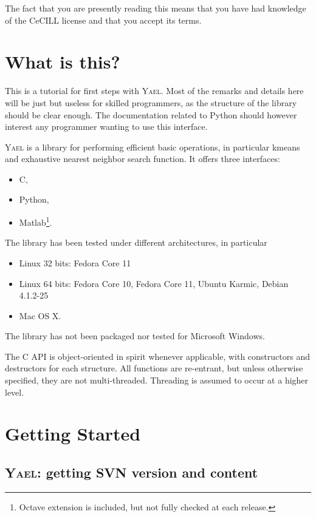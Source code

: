 \documentclass[a4paper,11pt,notitlepage,final,twoside]{report}
\newcommand{\yael}{\textsc{Yael}\xspace}
\begin{document}
The fact that you are presently reading this means that you have had
knowledge of the CeCILL license and that you accept its terms.


\tableofcontents            %


\chapter{What is this?}

This is a tutorial for first steps with \yael. Most of the remarks and details here will be just but useless for skilled programmers, as the structure of the library should be clear enough. The documentation related to Python should however interest any programmer wanting to use this interface. 
\medskip

\yael is a library for performing efficient basic operations, 
in particular kmeans and exhaustive nearest neighbor search function.
It offers three interfaces: 
\begin{itemize}
\item C, 
\item Python, 
\item Matlab\footnote{Octave extension is included, but not fully checked at each release.}.
\end{itemize}

The library has been tested under different architectures, in particular
\begin{itemize}
\item Linux 32 bits: Fedora Core 11
\item Linux 64 bits: Fedora Core 10, Fedora Core 11, Ubuntu Karmic, Debian 4.1.2-25
\item Mac OS X. 
\end{itemize}
The library has not been packaged nor tested for Microsoft Windows. 

The C API is object-oriented in spirit whenever applicable, with constructors and destructors for each structure. All functions are re-entrant, but unless otherwise specified, they are not multi-threaded. Threading is assumed to occur at a higher level. 

\chapter{Getting Started}
\label{cha:gettingstarted}

\section{\yael: getting SVN version and content}
\end{document}
